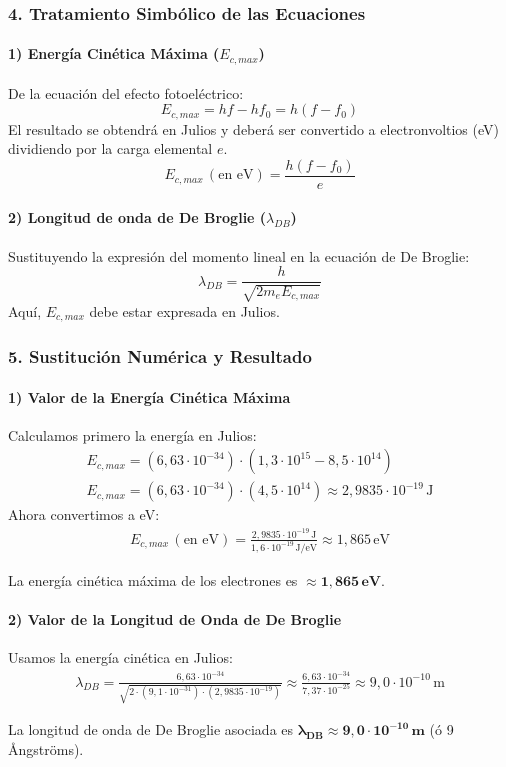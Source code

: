 \subsubsection*{4. Tratamiento Simbólico de las Ecuaciones}
\paragraph*{1) Energía Cinética Máxima ($E_{c,max}$)}
De la ecuación del efecto fotoeléctrico:
$$E_{c,max} = hf - hf_0 = h(f - f_0)$$
El resultado se obtendrá en Julios y deberá ser convertido a electronvoltios (eV) dividiendo por la carga elemental $e$.
$$E_{c,max} \, (\text{en eV}) = \frac{h(f - f_0)}{e}$$

\paragraph*{2) Longitud de onda de De Broglie ($\lambda_{DB}$)}
Sustituyendo la expresión del momento lineal en la ecuación de De Broglie:
$$\lambda_{DB} = \frac{h}{\sqrt{2 m_e E_{c,max}}}$$
Aquí, $E_{c,max}$ debe estar expresada en Julios.

\subsubsection*{5. Sustitución Numérica y Resultado}
\paragraph*{1) Valor de la Energía Cinética Máxima}
Calculamos primero la energía en Julios:
\begin{gather}
    E_{c,max} = (6,63 \cdot 10^{-34}) \cdot (1,3 \cdot 10^{15} - 8,5 \cdot 10^{14}) \\
    E_{c,max} = (6,63 \cdot 10^{-34}) \cdot (4,5 \cdot 10^{14}) \approx 2,9835 \cdot 10^{-19} \, \text{J}
\end{gather}
Ahora convertimos a eV:
\begin{gather}
    E_{c,max} \, (\text{en eV}) = \frac{2,9835 \cdot 10^{-19} \, \text{J}}{1,6 \cdot 10^{-19} \, \text{J/eV}} \approx 1,865 \, \text{eV}
\end{gather}
\begin{cajaresultado}
    La energía cinética máxima de los electrones es $\boldsymbol{\approx 1,865 \, \textbf{eV}}$.
\end{cajaresultado}

\paragraph*{2) Valor de la Longitud de Onda de De Broglie}
Usamos la energía cinética en Julios:
\begin{gather}
    \lambda_{DB} = \frac{6,63 \cdot 10^{-34}}{\sqrt{2 \cdot (9,1 \cdot 10^{-31}) \cdot (2,9835 \cdot 10^{-19})}} \approx \frac{6,63 \cdot 10^{-34}}{7,37 \cdot 10^{-25}} \approx 9,0 \cdot 10^{-10} \, \text{m}
\end{gather}
\begin{cajaresultado}
    La longitud de onda de De Broglie asociada es $\boldsymbol{\lambda_{DB} \approx 9,0 \cdot 10^{-10} \, \textbf{m}}$ (ó 9 Ångströms).
\end{cajaresultado}

